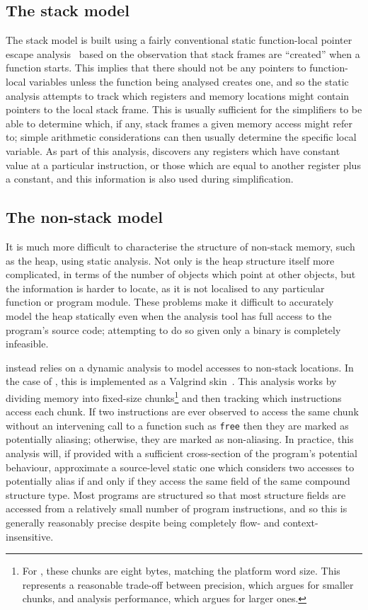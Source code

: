 \subsection{The stack model}
The stack model is built using a fairly conventional static
function-local pointer escape analysis~\cite[pages
  140--141]{Appel2004} based on the observation that stack frames are
``created'' when a function starts.  This implies that there should
not be any pointers to function-local variables unless the function
being analysed creates one, and so the static analysis attempts to
track which registers and memory locations might contain pointers to
the local stack frame.  This is usually sufficient for the
{\StateMachine} simplifiers to be able to determine which, if any,
stack frames a given memory access might refer to; simple arithmetic
considerations can then usually determine the specific local variable.
As part of this analysis, {\technique} discovers any registers which
have constant value at a particular instruction, or those which are
equal to another register plus a constant, and this information is
also used during {\StateMachine} simplification.

\subsection{The non-stack model}
It is much more difficult to characterise the structure of non-stack
memory, such as the heap, using static analysis.  Not only is the heap
structure itself more complicated, in terms of the number of objects
which point at other objects, but the information is harder to locate,
as it is not localised to any particular function or program module.
These problems make it difficult to accurately model the heap
statically even when the analysis tool has full access to the
program's source code; attempting to do so given only a binary is
completely infeasible.

{\Technique} instead relies on a dynamic analysis to model accesses to
non-stack locations.  In the case of {\implementation}, this is
implemented as a Valgrind skin~\cite{Nethercote2007}.  This analysis
works by dividing memory into fixed-size chunks\footnote{For
  {\implementation}, these chunks are eight bytes, matching the
  platform word size. This represents a reasonable trade-off between
  precision, which argues for smaller chunks, and analysis
  performance, which argues for larger ones.} and then tracking which
instructions access each chunk.  If two instructions are ever observed
to access the same chunk without an intervening call to a function
such as \texttt{free} then they are marked as potentially aliasing;
otherwise, they are marked as non-aliasing.  In practice, this
analysis will, if provided with a sufficient cross-section of the
program's potential behaviour, approximate a source-level static one
which considers two accesses to potentially alias if and only if they
access the same field of the same compound structure type.  Most
programs are structured so that most structure fields are accessed
from a relatively small number of program instructions, and so this is
generally reasonably precise despite being completely flow- and
context-insensitive.

